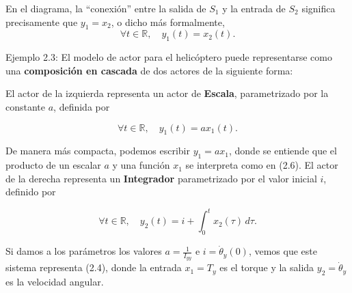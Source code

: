 \documentclass[12pt,a4paper]{article}
\begin{document}
En el diagrama, la “conexión” entre la salida de $S_1$ y la entrada de $S_2$ significa precisamente que $y_1 = x_2$, o dicho más formalmente,
\[
\forall t \in \mathbb{R}, \quad y_1(t) = x_2(t).
\]
\begin{tcolorbox}[colback=blue!10,colframe=blue!40!black]
Ejemplo 2.3: El modelo de actor para el helicóptero puede representarse como una \textbf{composición en cascada} de dos actores de la siguiente forma:

\begin{center}
\end{center}

El actor de la izquierda representa un actor de \textbf{Escala}, parametrizado por la constante $a$, definida por

\[
\forall t \in \mathbb{R}, \quad y_1(t) = a x_1(t). \tag{2.6}
\]

De manera más compacta, podemos escribir $y_1 = a x_1$, donde se entiende que el producto de un escalar $a$ y una función $x_1$ se interpreta como en (2.6).  
El actor de la derecha representa un \textbf{Integrador} parametrizado por el valor inicial $i$, definido por

\[
\forall t \in \mathbb{R}, \quad y_2(t) = i + \int_0^t x_2(\tau) \, d\tau.
\]

Si damos a los parámetros los valores $a = \tfrac{1}{I_{yy}}$ e $i = \dot{\theta}_y(0)$, vemos que este sistema representa (2.4), donde la entrada $x_1 = T_y$ es el torque y la salida $y_2 = \dot{\theta}_y$ es la velocidad angular.
\end{tcolorbox}
\end{document}

